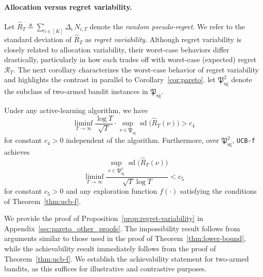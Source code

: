 \documentclass[nonblindrev]{informs3_noinforms}
\DeclareMathOperator{\sd}{sd}
\begin{document}
\paragraph{Allocation versus regret variability.} 
Let $\hat R_T \triangleq \sum_{i\in[K]} \Delta_i\, N_{i,T}$ denote the \emph{random pseudo-regret}. We refer to the standard deviation of $\hat R_T$ as \emph{regret variability}. Although regret variability is closely related to allocation variability, their worst-case behaviors differ drastically, particularly in how each trades off with worst-case (expected) regret $\mathcal{R}_T$. The next corollary characterizes the worst-case behavior of regret variability and highlights the contrast in parallel to Corollary~\ref{cor:pareto}. let $\mathfrak{P}^2_{\mathrm{sg}}$ denote the subclass of two-armed bandit instances in $\mathfrak{P}_{\mathrm{sg}}$.
\begin{proposition}\label{prop:regret-variability}
Under any active-learning algorithm, we have
\[
\liminf_{T\rightarrow\infty}\frac{\log T}{\sqrt{T}}\cdot
\sup_{\nu\in\mathfrak{P}_{\mathrm{sg}}}
\sd\!\big(\hat R_T(\nu)\big)
>c_4
\]
for constant $c_4 > 0$ independent of the algorithm. Furthermore, over $\mathfrak{P}^2_{\mathrm{sg}}$, \texttt{UCB-f} achieves
\[
\liminf_{T\rightarrow\infty}
\frac{\sup_{\nu\in\mathfrak{P}^2_{\mathrm{sg}}}
{\sd\!\big(\hat R_T(\nu)\big)}}{\sqrt{T}\log T}
<c_5
\]
for constant $c_5 > 0$ and any exploration function $f(\cdot)$ satisfying the conditions of Theorem~\ref{thm:ucb-f}.
\end{proposition}
We provide the proof of Proposition~\ref{prop:regret-variability} in Appendix~\ref{sec:pareto_other_proofs}. The impossibility result follows from arguments similar to those used in the proof of Theorem~\ref{thm:lower-bound}, while the achievability result immediately follows from the proof of Theorem~\ref{thm:ucb-f}. We establish the achievability statement for two-armed bandits, as this suffices for illustrative and contrastive purposes.  
\end{document}
